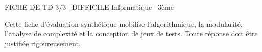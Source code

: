 \documentclass[11pt]{article}
\begin{document}
\begin{tcolorbox}[enhanced,colback=popink,colframe=popink,arc=10pt,boxrule=0pt,left=12pt,right=12pt,top=9pt,bottom=9pt]
{\color{white}\popxbold\small FICHE DE TD 3/3 \textbullet\ DIFFICILE \hfill Informatique \textbullet\ 3ème\par}
\end{tcolorbox}
\vspace{4pt}
\noindent Cette fiche d'évaluation synthétique mobilise l'algorithmique, la modularité, l'analyse de complexité et la conception de jeux de tests. Toute réponse doit être justifiée rigoureusement.
\end{document}
